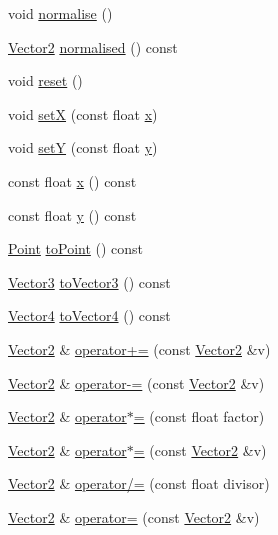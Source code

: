\begin{DoxyCompactItemize}
\item 
void \hyperlink{classprism_1_1_vector2_a828a5663c78de16fcc714f5604d0668b}{normalise} ()
\item 
\hyperlink{classprism_1_1_vector2}{Vector2} \hyperlink{classprism_1_1_vector2_a0e2e103ba688416d6343f41160484db3}{normalised} () const 
\item 
void \hyperlink{classprism_1_1_vector2_a5f4b534cf2e84711acb8028f388c8356}{reset} ()
\item 
void \hyperlink{classprism_1_1_vector2_a2f1a3d79e5f0867e60559dc0ea63b8d4}{setX} (const float \hyperlink{classprism_1_1_vector2_a03a3e6c084d4fda83cc688d22ffcf5bb}{x})
\item 
void \hyperlink{classprism_1_1_vector2_a87e9c4ae531f0f891091fe0241e54bb7}{setY} (const float \hyperlink{classprism_1_1_vector2_a6656aa95639282560722da4b5da76423}{y})
\item 
const float \hyperlink{classprism_1_1_vector2_a03a3e6c084d4fda83cc688d22ffcf5bb}{x} () const 
\item 
const float \hyperlink{classprism_1_1_vector2_a6656aa95639282560722da4b5da76423}{y} () const 
\item 
\hyperlink{classprism_1_1_point}{Point} \hyperlink{classprism_1_1_vector2_a8865c6f53a7d20f078db0105f9eedcf1}{to\+Point} () const 
\item 
\hyperlink{classprism_1_1_vector3}{Vector3} \hyperlink{classprism_1_1_vector2_aa48bc310947baa86b092a72dad20a302}{to\+Vector3} () const 
\item 
\hyperlink{classprism_1_1_vector4}{Vector4} \hyperlink{classprism_1_1_vector2_ad3c9cf0b36f92f8afd6a9f702122c1d8}{to\+Vector4} () const 
\item 
\hyperlink{classprism_1_1_vector2}{Vector2} \& \hyperlink{classprism_1_1_vector2_a1247e429a7349596a6aff730b6c39640}{operator+=} (const \hyperlink{classprism_1_1_vector2}{Vector2} \&v)
\item 
\hyperlink{classprism_1_1_vector2}{Vector2} \& \hyperlink{classprism_1_1_vector2_ac26e9374361918083b06b89b9f558685}{operator-\/=} (const \hyperlink{classprism_1_1_vector2}{Vector2} \&v)
\item 
\hyperlink{classprism_1_1_vector2}{Vector2} \& \hyperlink{classprism_1_1_vector2_a39086612703b2445da82f947705d0484}{operator$\ast$=} (const float factor)
\item 
\hyperlink{classprism_1_1_vector2}{Vector2} \& \hyperlink{classprism_1_1_vector2_a7108d51dfdb758742d28be5f86599072}{operator$\ast$=} (const \hyperlink{classprism_1_1_vector2}{Vector2} \&v)
\item 
\hyperlink{classprism_1_1_vector2}{Vector2} \& \hyperlink{classprism_1_1_vector2_a0eeaeaa36c3dc531650a1c6775aec7f4}{operator/=} (const float divisor)
\item 
\hyperlink{classprism_1_1_vector2}{Vector2} \& \hyperlink{classprism_1_1_vector2_a5f3e1ca8123c50b34c427abf5e9dd5e0}{operator=} (const \hyperlink{classprism_1_1_vector2}{Vector2} \&v)
\end{DoxyCompactItemize}
